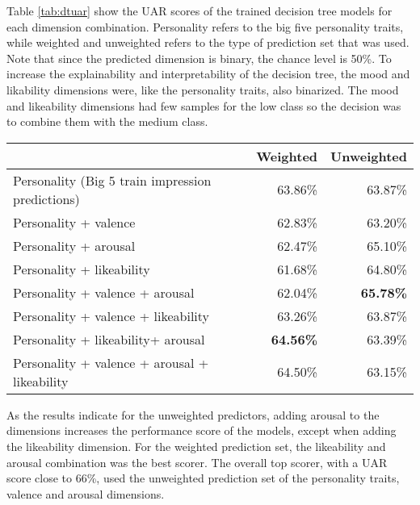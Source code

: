 Table \ref{tab:dtuar} show the UAR scores of the trained decision tree models for each dimension combination. Personality refers to the big five personality traits, while weighted and unweighted refers to the type of prediction set that was used. Note that since the predicted dimension is binary, the chance level is 50\%. To increase the explainability and interpretability of the decision tree, the mood and likability dimensions were, like the personality traits, also binarized. The mood and likeability dimensions had few samples for the low class so the decision was to combine them with the medium class.

\begin{table*}[]
\begin{tabular}{|l|r|r|}
\hline
\rowcolor{Gray}
 & \multicolumn{1}{l|}{Weighted} & \multicolumn{1}{l|}{Unweighted} \\ \hline
Personality (Big 5 train impression predictions)& \cellcolor[HTML]{86CEAB}63.86\% & \cellcolor[HTML]{D1EDDF}63.87\% \\ \hline
Personality + valence & \cellcolor[HTML]{CBEADB}62.83\% & \cellcolor[HTML]{FCFEFD}63.20\% \\ \hline
Personality + arousal & \cellcolor[HTML]{E3F4EC}62.47\% & \cellcolor[HTML]{83CDA9}65.10\% \\ \hline
Personality + likeability & 61.68\% & 64.80\% \\ \hline
Personality + valence + arousal & \cellcolor[HTML]{FFFFFF}62.04\% & \cellcolor[HTML]{57BB8A}\textbf{65.78\%} \\ \hline
Personality + valence + likeability & 63.26\% & \cellcolor[HTML]{D1EDDF}63.87\% \\ \hline
Personality + likeability+ arousal & \cellcolor[HTML]{57BB8A}\textbf{64.56\%} & \cellcolor[HTML]{F0F9F5}63.39\% \\ \hline
Personality + valence + arousal + likeability & \cellcolor[HTML]{5CBD8D}64.50\% & \cellcolor[HTML]{FFFFFF}63.15\% \\ \hline
\end{tabular}
\caption{UAR scores of the modeled Decision Trees per dimension combination.}
\label{tab:dtuar}
\end{table*}

As the results indicate for the unweighted predictors, adding arousal to the dimensions increases the performance score of the models, except when adding the likeability dimension. For the weighted prediction set, the likeability and arousal combination was the best scorer. The overall top scorer, with a UAR score close to 66\%, used the unweighted prediction set of the personality traits, valence and arousal dimensions. 

